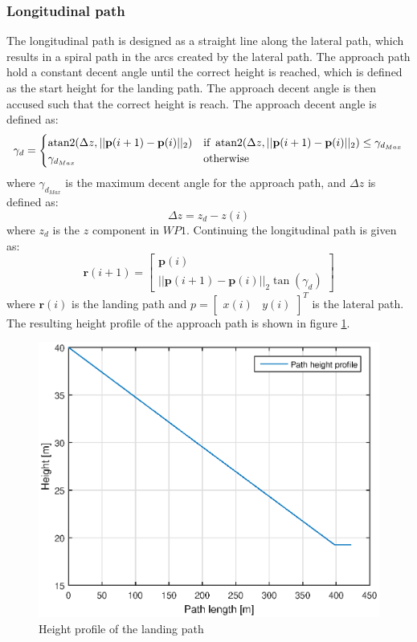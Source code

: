 \subsubsection{Longitudinal path}
The longitudinal path is designed as a straight line along the lateral path, which results in a spiral path in the arcs created by the lateral path. The approach path hold a constant decent angle until the correct height is reached, which is defined as the start height for the landing path. The approach decent angle is then accused such that the correct height is reach. The approach decent angle is defined as:
\begin{equation}
\gamma_d = \begin{cases}
\atan2(\Delta z,||\mathbf{p}(i+1)-\mathbf{p}(i)||_2) & \text{if } \atan2(\Delta z,||\mathbf{p}(i+1)-\mathbf{p}(i)||_2)\leq \gamma_{d_{Max}} \\
\gamma_{d_{Max}}										& \text{otherwise}
\end{cases}
\end{equation}
where $\gamma_{d_{Max}}$ is the maximum decent angle for the approach path, and $\Delta z$ is defined as:
\begin{equation}
\Delta z = z_d-z(i)
\end{equation}
where $z_d$ is the $z$ component in $WP1$. Continuing the longitudinal path is given as:
\begin{equation}
\mathbf{r}(i+1) = \begin{bmatrix}
\mathbf{p}(i) \\
||\mathbf{p}(i+1)-\mathbf{p}(i)||_2\tan(\gamma_d)
\end{bmatrix}
\end{equation}
where $\mathbf{r}(i)$ is the landing path and 
$p = \begin{bmatrix}
x(i) & y(i)
\end{bmatrix}^T$ is the lateral path. The resulting height profile of the approach path is shown in figure \ref{Fig:HeightProfile}.
\begin{figure}[H]
	\centering
		\includegraphics[width=1\textwidth]{figs/SysPlot/heightProfile.eps}
		\caption{Height profile of the landing path}
		\label{Fig:HeightProfile}
\end{figure}
